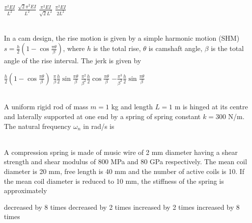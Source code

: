 \documentclass[addpoints,11pt]{exam}
\begin{document}
\begin{questions}
        \begin{oneparchoices}
            \choice $\frac{\pi^2EI}{L^2}$
            \choice $\frac{\sqrt{2}\pi^2EI}{L^2}$
            \choice $\frac{\pi^2EI}{\sqrt{2}L^2}$
            \choice $\frac{\pi^2EI}{2L^2}$
        \end{oneparchoices}\\

        \question In a cam design, the rise motion is given by a simple harmonic motion (SHM) $s=\frac{h}{2}(1-\cos\frac{\pi\theta}{\beta})$, where $h$ is the total rise, $\theta$ is camshaft angle, $\beta$ is the total angle of the rise interval. The jerk is given by\\

        \begin{oneparchoices}
            \choice $\frac{h}{2}(1-\cos\frac{\pi\theta}{\beta})$
            \choice $\frac{\pi}{\beta}\frac{h}{2}\sin\frac{\pi\theta}{\beta}$
            \choice $\frac{\pi^2}{\beta^2}\frac{h}{2}\cos\frac{\pi\theta}{\beta}$
            \choice $-\frac{\pi^3}{\beta^3}\frac{h}{2}\sin\frac{\pi\theta}{\beta}$
        \end{oneparchoices}\\

        \question A uniform rigid rod of mass $m=1$ kg and length $L=1$ m is hinged at its centre and laterally supported at one end by a spring of spring constant $k=300$ N/m. The natural frequency $\omega_n$ in rad/s is\\

        \begin{oneparchoices}
        \end{oneparchoices}\\

        \question A compression spring is made of music wire of 2 mm diameter having a shear strength and shear modulus of 800 MPa and 80 GPa respectively. The mean coil diameter is 20 mm, free length is 40 mm and the number of active coils is 10. If the mean coil diameter is reduced to 10 mm, the stiffness of the spring is approximately\\

        \begin{oneparchoices}
            \choice decreased by 8 times
            \choice decreased by 2 times
            \choice increased by 2 times
            \choice increased by 8 times
        \end{oneparchoices}\\


\end{questions}
\end{document}
